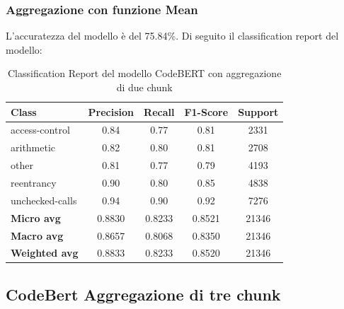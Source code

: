 \documentclass[../../Thesis.tex]{subfiles}
\begin{document}
\subsubsection{Aggregazione con funzione Mean}
L'accuratezza del modello \`e del 75.84\%. Di seguito il classification report del modello:
\begin{table}[H]
    \centering
    \small
    \begin{tabular}{lcccc}
    \hline
    \textbf{Class} & \textbf{Precision} & \textbf{Recall} & \textbf{F1-Score} & \textbf{Support} \\
    \hline
    access-control & 0.84 & 0.77 & 0.81 & 2331 \\
    arithmetic & 0.82 & 0.80 & 0.81 & 2708 \\
    other & 0.81 & 0.77 & 0.79 & 4193 \\
    reentrancy & 0.90 & 0.80 & 0.85 & 4838 \\
    unchecked-calls & 0.94 & 0.90 & 0.92 & 7276 \\
    \hline
    \textbf{Micro avg} & 0.8830 & 0.8233 & 0.8521 & 21346 \\
    \textbf{Macro avg} & 0.8657 & 0.8068 & 0.8350 & 21346 \\
    \textbf{Weighted avg} & 0.8833 & 0.8233 & 0.8520 & 21346 \\
    \hline
    \end{tabular}
    \caption{Classification Report del modello CodeBERT con aggregazione di due chunk}
    \end{table}


    
\subsection{CodeBert Aggregazione di tre chunk}
\end{document}
